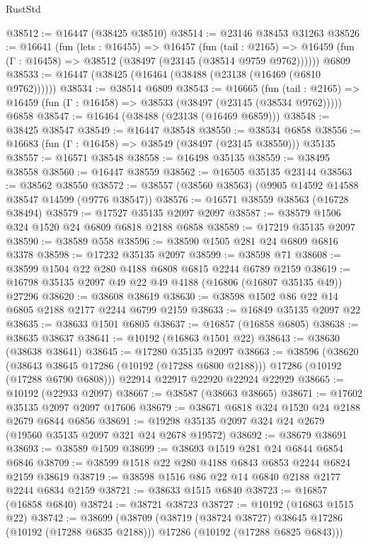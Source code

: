 \begin{lexlean}{RustStd}
\begin{coremodule}
@38512 := @16447 (@38425 @38510)
@38514 := @23146 @38453 @31263
@38526 := @16641
    (fun (lets : @16455) =>
    @16457
      (fun (tail : @2165) =>
      @16459 (fun (Γ : @16458) => @38512 (@38497 (@23145 (@38514 @9759 @9762))))))
    @6809
@38533 := @16447 (@38425 (@16464 (@38488 (@23138 (@16469 (@6810 @9762))))))
@38534 := @38514 @6809
@38543 := @16665
    (fun (tail : @2165) => @16459 (fun (Γ : @16458) => @38533 (@38497 (@23145 (@38534 @9762)))))
    @6858
@38547 := @16464 (@38488 (@23138 (@16469 @6859)))
@38548 := @38425 @38547
@38549 := @16447 @38548
@38550 := @38534 @6858
@38556 := @16683 (fun (Γ : @16458) => @38549 (@38497 (@23145 @38550))) @35135
@38557 := @16571 @38548
@38558 := @16498 @35135
@38559 := @38495 @38558
@38560 := @16447 @38559
@38562 := @16505 @35135 @23144
@38563 := @38562 @38550
@38572 := @38557 (@38560 @38563) (@9905 @14592 @14588 @38547 @14599 (@9776 @38547))
@38576 := @16571 @38559 @38563 (@16728 @38494)
@38579 := @17527 @35135 @2097 @2097
@38587 := @38579 @1506 @324 @1520 @24 @6809 @6818 @2188 @6858
@38589 := @17219 @35135 @2097
@38590 := @38589 @558
@38596 := @38590 @1505 @281 @24 @6809 @6816 @3378
@38598 := @17232 @35135 @2097
@38599 := @38598 @71
@38608 := @38599 @1504 @22 @280 @4188 @6808 @6815 @2244 @6789 @2159
@38619 := @16798 @35135 @2097 @49 @22 @49 @4188 (@16806 (@16807 @35135 @49)) @27296
@38620 := @38608 @38619
@38630 := @38598 @1502 @86 @22 @14 @6805 @2188 @2177 @2244 @6799 @2159
@38633 := @16849 @35135 @2097 @22
@38635 := @38633 @1501 @6805
@38637 := @16857 (@16858 @6805)
@38638 := @38635 @38637
@38641 := @10192 (@16863 @1501 @22)
@38643 := @38630 (@38638 @38641)
@38645 := @17280 @35135 @2097
@38663 := @38596
    (@38620
      (@38643 @38645 @17286 (@10192 (@17288 @6800 @2188)))
      @17286
      (@10192 (@17288 @6790 @6808)))
    @22914
    @22917
    @22920
    @22924
    @22929
@38665 := @10192 (@22933 @2097)
@38667 := @38587 (@38663 @38665)
@38671 := @17602 @35135 @2097 @2097 @17606
@38679 := @38671 @6818 @324 @1520 @24 @2188 @2679 @6844 @6856
@38691 := @19298 @35135 @2097 @324 @24 @2679 (@19560 @35135 @2097 @321 @24 @2678 @19572)
@38692 := @38679 @38691
@38693 := @38589 @1509
@38699 := @38693 @1519 @281 @24 @6844 @6854 @6846
@38709 := @38599 @1518 @22 @280 @4188 @6843 @6853 @2244 @6824 @2159 @38619
@38719 := @38598 @1516 @86 @22 @14 @6840 @2188 @2177 @2244 @6834 @2159
@38721 := @38633 @1515 @6840
@38723 := @16857 (@16858 @6840)
@38724 := @38721 @38723
@38727 := @10192 (@16863 @1515 @22)
@38742 := @38699
    (@38709
      (@38719 (@38724 @38727) @38645 @17286 (@10192 (@17288 @6835 @2188)))
      @17286
      (@10192 (@17288 @6825 @6843)))

\end{coremodule}
\end{lexlean}

